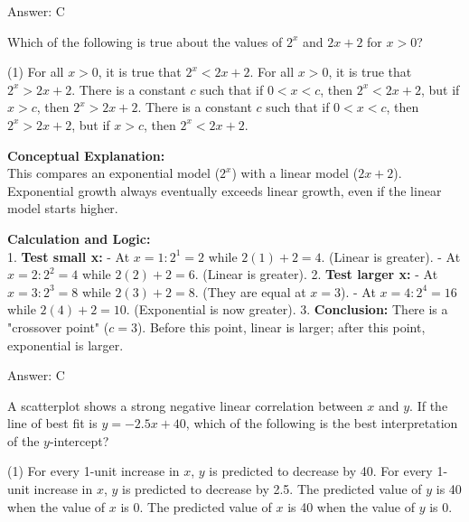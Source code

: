 \documentclass[11pt,paper=a4,answers]{exam}
\begin{document}
\begin{questions}
\begin{solution}
\vspace{30pt}

Answer: \colorbox{yellow!100}{C}
\end{solution}

\vspace{60pt}

\question
Which of the following is true about the values of $2^x$ and $2x + 2$ for $x > 0$?
\begin{tasks}(1)
    \task For all $x > 0$, it is true that $2^x < 2x + 2$.
    \task For all $x > 0$, it is true that $2^x > 2x + 2$.
    \task There is a constant $c$ such that if $0 < x < c$, then $2^x < 2x + 2$, but if $x > c$, then $2^x > 2x + 2$.
    \task There is a constant $c$ such that if $0 < x < c$, then $2^x > 2x + 2$, but if $x > c$, then $2^x < 2x + 2$.
\end{tasks}

\begin{solution}
\textbf{Conceptual Explanation:} \\
This compares an exponential model ($2^x$) with a linear model ($2x + 2$). Exponential growth always eventually exceeds linear growth, even if the linear model starts higher.

\vspace{30pt}

\textbf{Calculation and Logic:} \\
1. \textbf{Test small x:} 
   - At $x = 1: 2^1 = 2$ while $2(1) + 2 = 4$. (Linear is greater).
   - At $x = 2: 2^2 = 4$ while $2(2) + 2 = 6$. (Linear is greater).
2. \textbf{Test larger x:}
   - At $x = 3: 2^3 = 8$ while $2(3) + 2 = 8$. (They are equal at $x=3$).
   - At $x = 4: 2^4 = 16$ while $2(4) + 2 = 10$. (Exponential is now greater).
3. \textbf{Conclusion:} There is a "crossover point" ($c=3$). Before this point, linear is larger; after this point, exponential is larger.

\vspace{30pt}

Answer: \colorbox{yellow!100}{C}
\end{solution}

\question
A scatterplot shows a strong negative linear correlation between $x$ and $y$. If the line of best fit is $y = -2.5x + 40$, which of the following is the best interpretation of the $y$-intercept?
\begin{tasks}(1)
    \task For every 1-unit increase in $x$, $y$ is predicted to decrease by 40.
    \task For every 1-unit increase in $x$, $y$ is predicted to decrease by 2.5.
    \task The predicted value of $y$ is 40 when the value of $x$ is 0.
    \task The predicted value of $x$ is 40 when the value of $y$ is 0.
\end{tasks}


\end{questions}
\end{document}
